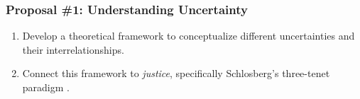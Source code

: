 \begin{frame}
    \frametitle{Proposal \#1: Understanding Uncertainty}

    \begin{enumerate}
        \item Develop a theoretical framework to conceptualize different
        uncertainties and their interrelationships.
        \item Connect this framework to \textit{justice}, specifically
        Schlosberg's three-tenet paradigm 
        \cite{schlosberg_reconceiving_2004}.
    \end{enumerate}

\end{frame}